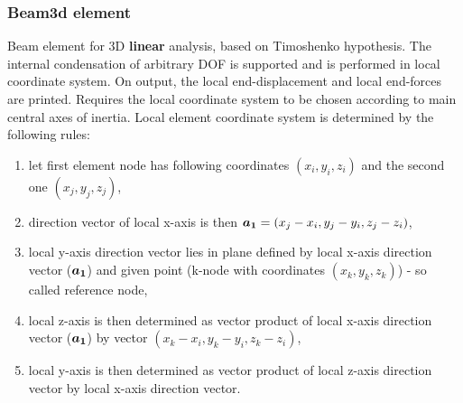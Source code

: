 \documentclass[a4paper]{article}
\newcommand{\mbf}[1]{\mbox{\boldmath$#1$}}
\begin{document}
\subsubsection{Beam3d element}
Beam element for 3D {\bf linear} analysis, based on Timoshenko hypothesis. The internal condensation
of arbitrary DOF is supported and is performed in local coordinate
system. On output, the local end-displacement and local end-forces are
printed. Requires the local coordinate system to be chosen according
to main central axes of inertia. Local element 
coordinate system is determined by the following rules:
\begin{enumerate}
\item let first element node has following coordinates $(x_i, y_i, z_i)$
and the second one $(x_j, y_j, z_j)$,
\item direction vector of local x-axis is then $\mbf{a_1} = (x_j-x_i, y_j-y_i, z_j-z_i)$,
\item local y-axis direction vector lies in plane defined by local
x-axis direction vector ($\mbf{a_1}$) and given
point (k-node with coordinates $(x_k, y_k, z_k)$) - so called reference node,
\item local z-axis is then determined as vector product of local
x-axis direction vector ($\mbf{a_1}$) by vector $(x_k-x_i, y_k-y_i, z_k-z_i)$,
\item local y-axis is then determined as vector product of local
z-axis direction vector by local x-axis direction vector. 
\end{enumerate}
\end{document}
